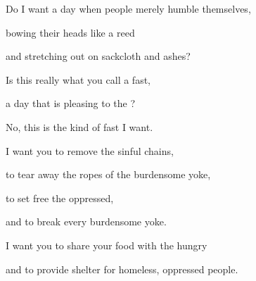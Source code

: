 {\par }{\Q Do I want
a day
when people
merely humble
themselves,
\par }{\Q bowing
their heads
like a reed
\par }{\Q and stretching
out on sackcloth
and ashes?
\par }{\Q Is this
really what you call
a fast,
\par }{\Q a day
that is pleasing
to the
{}?
\par }{\Q {}No,
this
is the kind of fast
I want.
\par }{\Q I want you to remove the sinful chains,
\par }{\Q to tear away the ropes of the burdensome yoke,
\par }{\Q to set free the oppressed,
\par }{\Q and to break every burdensome yoke.
\par }{\Q {}I want you to share
your food
with the hungry
\par }{\Q and to provide
shelter
for
homeless,
oppressed
people.

}
